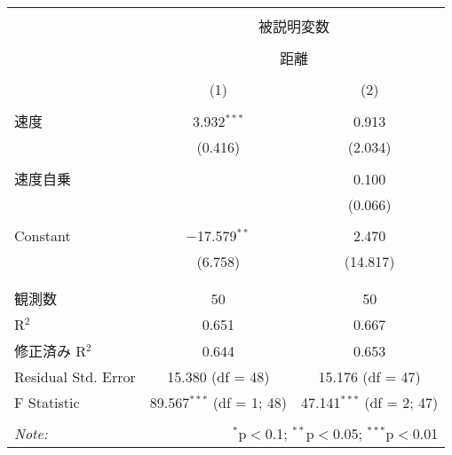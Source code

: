 
\begin{table}[!htbp] \centering 
  \caption{} 
  \label{} 
\begin{tabular}{@{\extracolsep{5pt}}lcc} 
\\[-1.8ex]\hline 
\hline \\[-1.8ex] 
 & \multicolumn{2}{c}{被説明変数} \\ 
\cline{2-3} 
\\[-1.8ex] & \multicolumn{2}{c}{距離} \\ 
\\[-1.8ex] & (1) & (2)\\ 
\hline \\[-1.8ex] 
 速度 & 3.932$^{***}$ & 0.913 \\ 
  & (0.416) & (2.034) \\ 
  & & \\ 
 速度自乗 &  & 0.100 \\ 
  &  & (0.066) \\ 
  & & \\ 
 Constant & $-$17.579$^{**}$ & 2.470 \\ 
  & (6.758) & (14.817) \\ 
  & & \\ 
\hline \\[-1.8ex] 
観測数 & 50 & 50 \\ 
R$^{2}$ & 0.651 & 0.667 \\ 
修正済み R$^{2}$ & 0.644 & 0.653 \\ 
Residual Std. Error & 15.380 (df = 48) & 15.176 (df = 47) \\ 
F Statistic & 89.567$^{***}$ (df = 1; 48) & 47.141$^{***}$ (df = 2; 47) \\ 
\hline 
\hline \\[-1.8ex] 
\textit{Note:}  & \multicolumn{2}{r}{$^{*}$p$<$0.1; $^{**}$p$<$0.05; $^{***}$p$<$0.01} \\ 
\end{tabular} 
\end{table} 
